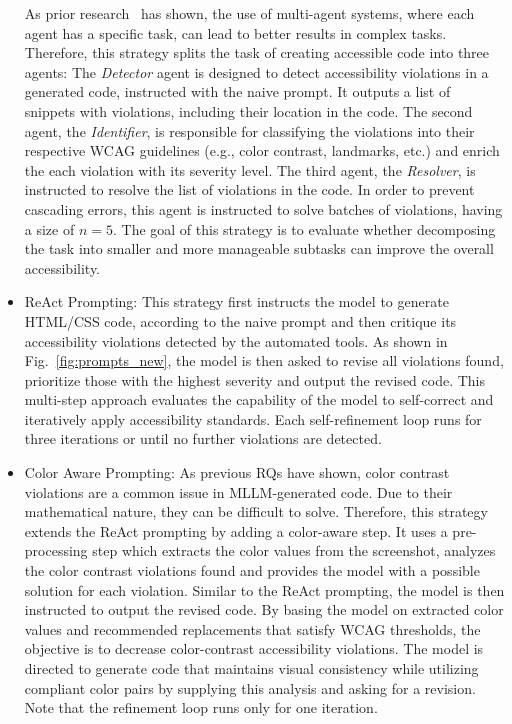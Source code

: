 \begin{itemize}
    As prior research~\cite{wu2023autogen} has shown, the use of multi-agent 
    systems, where each agent has a specific task, can lead to better
    results in complex tasks. Therefore, this strategy splits the 
    task of creating accessible code into three agents: The 
    \textit{Detector} agent is designed to detect accessibility violations 
    in a generated code, instructed with the naive prompt. It outputs a list
    of snippets with violations, including their location in the code. The 
    second agent, the \textit{Identifier}, is responsible for classifying 
    the violations into their respective WCAG guidelines (e.g., 
    color contrast, landmarks, etc.) and enrich the each violation with 
    its severity level. The third agent, the \textit{Resolver}, is 
    instructed to resolve the list of violations in the code. In order to 
    prevent cascading errors, this agent is instructed to solve batches 
    of violations, having a size of \(n = 5\). The goal of this strategy 
    is to evaluate whether decomposing the task into smaller and more 
    manageable subtasks can improve the overall accessibility.
    \item ReAct Prompting: 
    This strategy first instructs the model to generate HTML/CSS code, 
    according to the naive prompt and then critique its accessibility
    violations detected by the automated tools. As shown in 
    Fig.~\ref{fig:prompts_new}, the model is then asked to revise
    all violations found, prioritize those with the highest 
    severity and output the revised code.
    This multi-step approach evaluates the capability of the model to 
    self-correct and iteratively apply accessibility standards. 
    Each self-refinement loop runs for three iterations or until 
    no further violations are detected.
    \item Color Aware Prompting: 
    As previous RQs have shown, color contrast violations are a common 
    issue in MLLM-generated code. Due to their mathematical nature, they
    can be difficult to solve. Therefore, this strategy extends the ReAct 
    prompting by adding a color-aware step. It uses a pre-processing 
    step which extracts the color values from the screenshot, analyzes 
    the color contrast violations found and provides the model with a 
    possible solution for each violation. Similar to the ReAct prompting,
    the model is then instructed to output the revised code. 
    By basing the model on extracted color values and recommended 
    replacements that satisfy WCAG thresholds, the objective is to 
    decrease color-contrast accessibility violations. The model is 
    directed to generate code that maintains visual consistency while 
    utilizing compliant color pairs by supplying this analysis and 
    asking for a revision.
    Note that the refinement loop runs only for one iteration.
\end{itemize}

